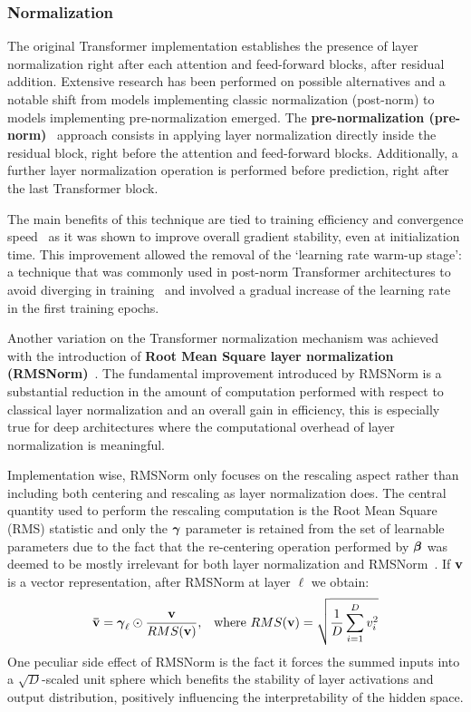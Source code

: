 \subsubsection*{Normalization}

The original Transformer implementation establishes the presence of layer normalization right after each attention and feed-forward blocks, after residual addition.
Extensive research has been performed on possible alternatives and a notable shift from models implementing classic normalization (post-norm) to models implementing pre-normalization emerged.
The \textbf{pre-normalization (pre-norm)}~\cite{baevski2019,xiong2020} approach consists in applying layer normalization directly inside the residual block, right before the attention and feed-forward blocks.
Additionally, a further layer normalization operation is performed before prediction, right after the last Transformer block.

The main benefits of this technique are tied to training efficiency and convergence speed~\cite{xiong2020} as it was shown to improve overall gradient stability, even at initialization time.
This improvement allowed the removal of the `learning rate warm-up stage': a technique that was commonly used in post-norm Transformer architectures to avoid diverging in training~\cite{popel2018} and involved a gradual increase of the learning rate in the first training epochs.

Another variation on the Transformer normalization mechanism was achieved with the introduction of \textbf{Root Mean Square layer normalization (RMSNorm)}~\cite{zhang2019}.
The fundamental improvement introduced by RMSNorm is a substantial reduction in the amount of computation performed with respect to classical layer normalization and an overall gain in efficiency, this is especially true for deep architectures where the computational overhead of layer normalization is meaningful.

Implementation wise, RMSNorm only focuses on the rescaling aspect rather than including both centering and rescaling as layer normalization does.
The central quantity used to perform the rescaling computation is the Root Mean Square (RMS) statistic and only the $\bm{\mathbf{\gamma}}$ parameter is retained from the set of learnable parameters due to the fact that the re-centering operation performed by $\bm{\mathbf{\beta}}$ was deemed to be mostly irrelevant for both layer normalization and RMSNorm~\cite{zhang2019}.
If $\bm{\mathbf{v}}$ is a vector representation, after RMSNorm at layer $\ell$ we obtain:
\begin{equation}
    \label{eq:background_rmsnorm}
    \begin{aligned}
        \bm{\mathbf{\bar v}} = \bm{\mathbf{\gamma}}_\ell \odot \frac{\bm{\mathbf{v}}}{RMS(\bm{\mathbf{v}})}, &&
        \text{where}\ RMS(\bm{\mathbf{v}}) = \sqrt{\frac{1}{D}\sum_{i=1}^{D}{v_i^2}}
    \end{aligned}
\end{equation}
One peculiar side effect of RMSNorm is the fact it forces the summed inputs into a \mbox{$\sqrt{D}$-scaled} unit sphere which benefits the stability of layer activations and output distribution, positively influencing the interpretability of the hidden space.

